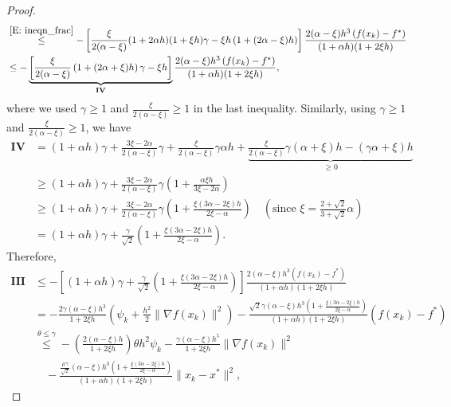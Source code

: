 \documentclass[pdflatex,sn-mathphys-num]{sn-jnl}
\theoremstyle{thmstyleone}
\theoremstyle{thmstyletwo}
\theoremstyle{thmstylethree}
\begin{document}
\begin{appendices}
\begin{proof}
\begin{align*}
&\stackrel{\eqref{E: ineqn_frac}}{\le} 
  - \left[ \frac{\xi}{2(\alpha-\xi)} (1+2\alpha h)(1+\xi h)\gamma - \xi h \left(1+(2\alpha-\xi) h\right) \right] \frac{ 2(\alpha-\xi) h^3 \left( f(x_k) - f^* \right) }{(1+\alpha h)(1+2\xi h)}\\
&\le
  - \underbrace{ \left[ \frac{\xi}{2(\alpha-\xi)}\left(1+(2\alpha+\xi) h\right)\gamma - \xi h \right] }_{\mathbf{IV}} \frac{ 2(\alpha-\xi) h^3 \left( f(x_k) - f^* \right) }{(1+\alpha h)(1+2\xi h)}, 
\end{align*}
where we used $\gamma\ge 1$ and $\frac{\xi}{2(\alpha-\xi)}\ge 1$ in the last inequality. Similarly, using $\gamma\ge 1$ and $\frac{\xi}{2(\alpha-\xi)}\ge 1$, we have 
\begin{align*}
\mathbf{IV}
&= (1+\alpha h)\gamma + \frac{3\xi-2\alpha}{2(\alpha-\xi)} \gamma 
  + \frac{\xi}{2(\alpha-\xi)}\gamma \alpha h  
  + \underbrace{ \frac{\xi}{2(\alpha-\xi)}\gamma(\alpha+\xi)h - (\gamma \alpha+\xi)h }_{\ge 0} \\
&\ge (1+\alpha h)\gamma + \frac{3\xi-2\alpha}{2(\alpha-\xi)} \gamma \left( 1 + \frac{\alpha\xi h}{3\xi-2\alpha} \right) \\
&\ge (1+\alpha h)\gamma + \frac{3\xi-2\alpha}{2(\alpha-\xi)} \gamma \left( 1 + \frac{\xi(3\alpha-2\xi)h}{2\xi-\alpha} \right) \quad \left( \text{since } \xi = \frac{2+\sqrt{2}}{3+\sqrt{2}}\alpha \right) \\
&= (1+\alpha h)\gamma + \frac{\gamma}{\sqrt{2}} \left( 1 + \frac{\xi(3\alpha-2\xi)h}{2\xi-\alpha} \right). 
\end{align*}
Therefore,
\begin{align*}
\mathbf{III}
&\le - \left[ (1+\alpha h)\gamma + \frac{\gamma}{\sqrt{2}}\left( 1 + \frac{\xi(3\alpha-2\xi)h}{2\xi-\alpha} \right) \right] \frac{ 2(\alpha-\xi) h^3 \left( f(x_k) - f^* \right) }{(1+\alpha h)(1+2\xi h)} \\
&= - \frac{ 2\gamma(\alpha-\xi) h^3 }{1+2\xi h}\left(\psi_k + \frac{h^2}{2}\| \nabla f(x_k) \|^2\right)
    - \frac{ \sqrt{2}\gamma(\alpha-\xi) h^3 \left( 1 + \frac{\xi(3\alpha-2\xi)h}{2\xi-\alpha} \right) }{(1+\alpha h)\left(1+2\xi h\right)} \left( f(x_k) - f^* \right) \\
&\stackrel{\theta\le\gamma}{\le} 
    - \left( \frac{ 2(\alpha-\xi) h }{1+2\xi h} \right)\theta h^2 \psi_k
    - \frac{ \gamma(\alpha-\xi) h^5 }{1+2\xi h} \| \nabla f(x_k) \|^2 \\
&\quad - \frac{ \frac{\mu\gamma}{\sqrt{2}}(\alpha-\xi) h^3 \left( 1 + \frac{\xi(3\alpha-2\xi)h}{2\xi-\alpha} \right) }{(1+\alpha h)\left(1+2\xi h\right)} \| x_k - x^* \|^2, 

\end{align*}
\end{proof}
\end{appendices}
\end{document}
